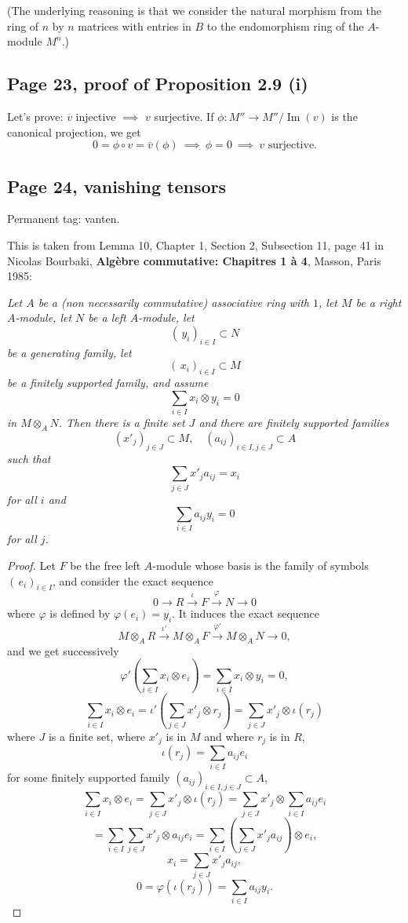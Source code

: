 \documentclass[parskip=half,fontsize=12pt]{scrartcl}%
\newcommand{\oo}{\operatorname}\newcommand{\ooo}{\operatorname*}
\begin{document}
(The underlying reasoning is that we consider the natural morphism from the ring of $n$ by $n$ matrices with entries in $B$ to the endomorphism ring of the $A$-module $M^n$.)

\subsection{Page 23, proof of Proposition 2.9 (i)}%

Let's prove: $\overline v$ injective $\implies$ $v$ surjective. If $\phi:M''\to M''/\oo{Im}(v)$ is the canonical projection, we get 
$$
0=\phi\circ v=\overline v(\phi)\ \implies\ \phi=0\ \implies\ v\text{ surjective.}
$$

\subsection{Page 24, vanishing tensors}\label{vt}%

Permanent tag: vanten.

This is taken from Lemma 10, Chapter 1, Section 2, Subsection 11, page 41 in Nicolas Bourbaki, \textbf{Algèbre commutative: Chapitres 1 à 4}, Masson, Paris 1985:

\emph{Let $A$ be a (non necessarily commutative) associative ring with $1$, let $M$ be a right $A$-module, let $N$ be a left $A$-module, let 
$$
(\,y_i)_{i\in I}\subset N
$$ 
be a generating family, let 
$$
(\,x_i)_{i\in I}\subset M
$$ 
be a finitely supported family, and assume 
$$
\sum_{i\in I}x_i\otimes y_i=0
$$ 
in $M\otimes_AN$. Then there is a finite set $J$ and there are finitely supported families 
$$
(x'_j)_{j\in J}\subset M,\quad(a_{ij})_{i\in I,j\in J}\subset A
$$ 
such that 
$$
\sum_{j\in J} x'_ja_{ij}=x_i
$$ 
for all $i$ and 
$$
\sum_{i\in I}a_{ij}y_i=0
$$ 
for all $j$.}

\begin{proof} 
Let $F$ be the free left $A$-module whose basis is the family of symbols $(\,e_i)_{i\in I}$, and consider the exact sequence 
$$
0\to R\xrightarrow\iota F\xrightarrow\varphi N\to 0
$$ 
where $\varphi$ is defined by $\varphi(e_i)=y_i$. It induces the exact sequence 
$$
M\otimes_AR\xrightarrow{\iota'}M\otimes_AF\xrightarrow{\varphi'}M\otimes_AN\to 0,
$$ 
and we get successively
$$
\varphi'\left(\sum_{i\in I}x_i\otimes e_i\right)=\sum_{i\in I}x_i\otimes y_i=0,
$$ 
$$
\sum_{i\in I}x_i\otimes e_i=\iota'\left(\sum_{j\in J}x'_j\otimes r_j\right)=\sum_{j\in J}x'_j\otimes\iota(r_j)
$$ 
where $J$ is a finite set, where $x'_j$ is in $M$ and where $r_j$ is in $R$, 
$$
\iota(r_j)=\sum_{i\in I}a_{ij}e_i
$$ 
for some finitely supported family $(a_{ij})_{i\in I,j\in J}\subset A$, 
$$
\sum_{i\in I}x_i\otimes e_i=\sum_{j\in J}x'_j\otimes\iota(r_j)=\sum_{j\in J} x'_j\otimes\sum_{i\in I}a_{ij}e_i
$$
$$
=\sum_{i\in I}\sum_{j\in J} x'_j\otimes a_{ij}e_i=\sum_{i\in I}\left(\sum_{j\in J}x'_ja_{ij}\right)\otimes e_i,
$$ 
$$
x_i=\sum_{j\in J}x'_ja_{ij},
$$ 
$$
0=\varphi(\iota(r_j))=\sum_{i\in I}a_{ij}y_i.
$$ 
\end{proof}
\end{document}
